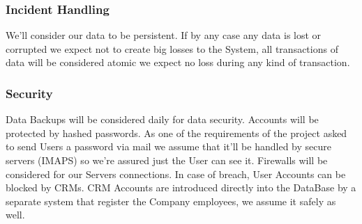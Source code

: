 \documentclass[a4paper]{article}
\begin{document}
\subsubsection{Incident Handling}
We'll consider our data to be persistent. If by any case any data is lost or corrupted we expect not to create big losses to the System, all transactions of data will be considered atomic we expect no loss during any kind of transaction. 

\subsubsection{Security}
Data Backups will be considered daily for data security. Accounts will be protected by hashed passwords. As one of the requirements of the project asked to send Users a password via mail we assume that it'll be handled by secure servers (IMAPS) so we're assured just the User can see it. Firewalls will be considered for our Servers connections. In case of breach, User Accounts can be blocked by CRMs. CRM Accounts are introduced directly into the DataBase by a separate system that register the Company employees, we assume it safely as well.
\end{document}
